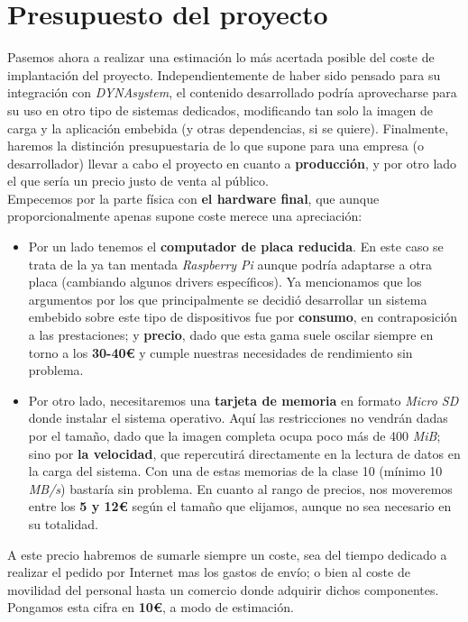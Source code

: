 \chapter{Presupuesto del proyecto}

Pasemos ahora a realizar una estimación lo más acertada posible del coste de implantación del proyecto. Independientemente de haber sido pensado para su integración con \textit{DYNAsystem}, el contenido desarrollado podría aprovecharse para su uso en otro tipo de sistemas dedicados, modificando tan solo la imagen de carga y la aplicación embebida (y otras dependencias, si se quiere). Finalmente, haremos la distinción presupuestaria de lo que supone para una empresa (o desarrollador) llevar a cabo el proyecto en cuanto a \textbf{producción}, y por otro lado el que sería un precio justo de venta al público.\\

Empecemos por la parte física con \textbf{el hardware final}, que aunque proporcionalmente apenas supone coste merece una apreciación:

\begin{itemize}
	\item Por un lado tenemos el \textbf{computador de placa reducida}. En este caso se trata de la ya tan mentada \textit{Raspberry Pi} aunque podría adaptarse a otra placa (cambiando algunos drivers específicos). Ya mencionamos que los argumentos por los que principalmente se decidió desarrollar un sistema embebido sobre este tipo de dispositivos fue por \textbf{consumo}, en contraposición a las prestaciones; y \textbf{precio}, dado que esta gama suele oscilar siempre en torno a los \textbf{30-40€} \cite{raspberry-pi-amazon} y cumple nuestras necesidades de rendimiento sin problema.
	\item Por otro lado, necesitaremos una \textbf{tarjeta de memoria} en formato \textit{Micro SD} donde instalar el sistema operativo. Aquí las restricciones no vendrán dadas por el tamaño, dado que la imagen completa ocupa poco más de 400 \textit{MiB}; sino por \textbf{la velocidad}, que repercutirá directamente en la lectura de datos en la carga del sistema. Con una de estas memorias de la clase 10 (mínimo 10 \textit{MB/s}) bastaría sin problema. En cuanto al rango de precios, nos moveremos entre los \textbf{5 y 12€} según el tamaño que elijamos, aunque no sea necesario en su totalidad.
\end{itemize}

A este precio habremos de sumarle siempre un coste, sea del tiempo dedicado a realizar el pedido por Internet mas los gastos de envío; o bien al coste de movilidad del personal hasta un comercio donde adquirir dichos componentes. Pongamos esta cifra en \textbf{10€}, a modo de estimación.\\

